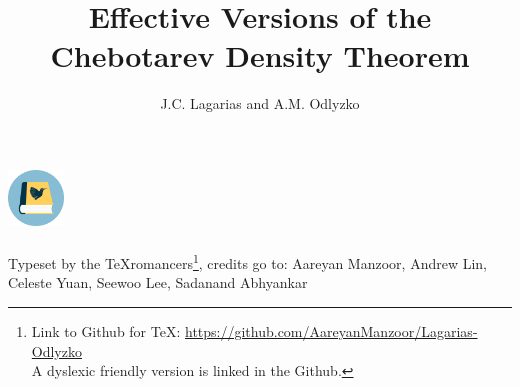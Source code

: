 \documentclass[twoside]{article}
\title{Effective Versions of the Chebotarev Density Theorem}
\author{J.C. Lagarias and A.M. Odlyzko}
\date{\vspace{-2em}}
\begin{document}
\maketitle

\renewcommand{\thefootnote}{$\dagger$}
\begin{center}
    \includegraphics[height=4em]{texromancers.pdf}\\ \phantom{1}\\
    Typeset by the TeXromancers\footnote{Link to Github for TeX: \url{https://github.com/AareyanManzoor/Lagarias-Odlyzko}\\ A dyslexic friendly version is linked in the Github.}, credits go to: Aareyan Manzoor, Andrew Lin, Celeste Yuan, Seewoo Lee, Sadanand Abhyankar %
\end{center}
\renewcommand{\thefootnote}{\arabic{footnote}}
 
\tableofcontents
{}

\pagestyle{fancy}











\pagestyle{plain}
\renewcommand*{\bibfont}{\small}
\printbibliography[
heading=bibintoc,
title={Bibliography},
]
\end{document}

